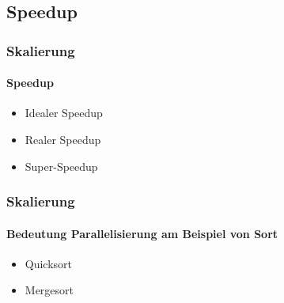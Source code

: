 \subsection{Speedup}
\begin{frame}
  \frametitle{Skalierung}
  \framesubtitle{Speedup}
  \begin{itemize}
    \item Idealer Speedup
    \item Realer Speedup
    \item Super-Speedup
  \end{itemize}
\end{frame}

\begin{frame}
  \frametitle{Skalierung}
  \framesubtitle{Bedeutung Parallelisierung am Beispiel von Sort}
  \begin{itemize}
    \item Quicksort
    \item Mergesort
  \end{itemize}
\end{frame}